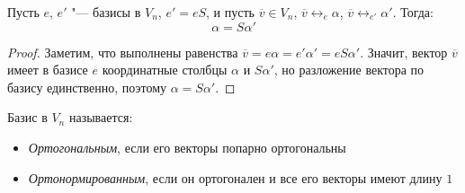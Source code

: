     \begin{theorem}
    	Пусть $e$, $e'$ "--- базисы в $V_n$, $e'= eS$, и пусть $\overline{v} \in V_n$, $\overline{v} \leftrightarrow_e \alpha$, $\overline{v} \leftrightarrow_{e'} \alpha'$. Тогда:
    	\[\alpha = S\alpha'\]
    \end{theorem}
    
    \begin{proof}
    	Заметим, что выполнены равенства $\overline{v} = e\alpha = e'\alpha' = eS\alpha'$. Значит, вектор $\overline{v}$ имеет в базисе $e$ координатные столбцы $\alpha$ и $S\alpha'$, но разложение вектора по базису единственно, поэтому $\alpha = S\alpha'$.
    \end{proof}
    
    \begin{definition}
    	Базис в $V_n$ называется:
    	\begin{itemize}
    		\item \textit{Ортогональным}, если его векторы попарно ортогональны
    		\item \textit{Ортонормированным}, если он ортогонален и все его векторы имеют длину $1$
    	\end{itemize}
    \end{definition}
